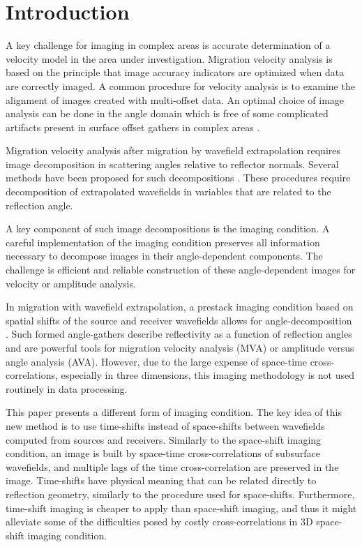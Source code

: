 \section{Introduction}
A key challenge for imaging in complex areas is accurate determination
of a velocity model in the area under investigation.  Migration
velocity analysis is based on the principle that image accuracy
indicators are optimized when data are correctly imaged.  A common
procedure for velocity analysis is to examine the alignment of images
created with multi-offset data.  An optimal choice of image analysis
can be done in the angle domain which is free of some complicated
artifacts present in surface offset gathers in complex areas
\cite[]{GEO69-02-05620575}.

\par Migration velocity analysis after migration by wavefield
extrapolation requires image decomposition in scattering angles
relative to reflector normals. Several methods have been proposed for
such decompositions \cite[]{GEO55-09-12231234, SEG-1999-08240827,
SEG-2000-08300833, GEO67-03-08830889, XieWu.adcig, GEO68-03-10651074,
SEG-2003-08890892, Fomel.seg.3dadcig, GEO69-05-12831298}.  These
procedures require decomposition of extrapolated wavefields in
variables that are related to the reflection angle.

A key component of such image decompositions is the imaging condition.
A careful implementation of the imaging condition preserves all
information necessary to decompose images in their angle-dependent
components.  The challenge is efficient and reliable construction of
these angle-dependent images for velocity or amplitude analysis.

In migration with wavefield extrapolation, a prestack imaging
condition based on spatial shifts of the source and receiver
wavefields allows for angle-decomposition
\cite[]{GEO67-03-08830889,SavaFomel.pag}.  Such formed angle-gathers
describe reflectivity as a function of reflection angles and are
powerful tools for migration velocity analysis (MVA) or amplitude
versus angle analysis (AVA).  However, due to the large expense of
space-time cross-correlations, especially in three dimensions, this
imaging methodology is not used routinely in data processing.

This paper presents a different form of imaging condition.  The key
idea of this new method is to use time-shifts instead of space-shifts
between wavefields computed from sources and receivers.  Similarly to
the space-shift imaging condition, an image is built by space-time
cross-correlations of subsurface wavefields, and multiple lags of the
time cross-correlation are preserved in the image.  Time-shifts have
physical meaning that can be related directly to reflection geometry,
similarly to the procedure used for space-shifts.  Furthermore,
time-shift imaging is cheaper to apply than space-shift imaging, and
thus it might alleviate some of the difficulties posed by costly
cross-correlations in 3D space-shift imaging condition.


